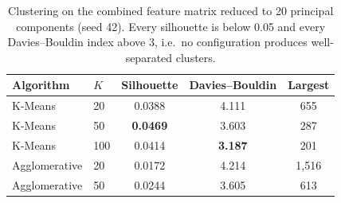 \begin{table}[t]
\caption{Clustering on the combined feature matrix reduced to 20 principal
components (seed 42). Every silhouette is below 0.05 and every Davies--Bouldin
index above 3, i.e.\ no configuration produces well-separated clusters.}
\label{tab:clustering}
\centering
\footnotesize
\setlength{\tabcolsep}{4pt}
\begin{tabular}{@{}llccc@{}}
\toprule
\textbf{Algorithm} & \textbf{$K$} & \textbf{Silhouette} & \textbf{Davies--Bouldin} & \textbf{Largest} \\
\midrule
K-Means       & 20  & 0.0388 & 4.111 & 655 \\
K-Means       & 50  & \textbf{0.0469} & 3.603 & 287 \\
K-Means       & 100 & 0.0414 & \textbf{3.187} & 201 \\
Agglomerative & 20  & 0.0172 & 4.214 & 1{,}516 \\
Agglomerative & 50  & 0.0244 & 3.605 & 613 \\
\bottomrule
\end{tabular}
\end{table}
